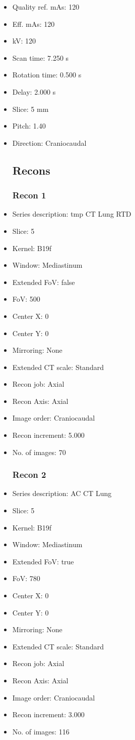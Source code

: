 \documentclass[12pt]{article}
\begin{document}
\begin{itemize}
\subsection{Scan}
\item Quality ref. mAs: 120\item Eff. mAs: 120\item kV: 120\item Scan time: 7.250 s\item Rotation time: 0.500 s\item Delay: 2.000 s\item Slice: 5 mm\item Pitch: 1.40\item Direction: Craniocaudal\subsection{Recons}

\subsubsection{Recon 1}
\item Series description: tmp CT Lung RTD
\item Slice: 5
\item Kernel: B19f
\item Window: Mediastinum
\item Extended FoV: false
\item FoV: 500
\item Center X: 0
\item Center Y: 0
\item Mirroring: None
\item Extended CT scale: Standard
\item Recon job: Axial
\item Recon Axis: Axial
\item Image order: Craniocaudal
\item Recon increment: 5.000
\item No. of images: 70
\subsubsection{Recon 2}
\item Series description: AC CT Lung
\item Slice: 5
\item Kernel: B19f
\item Window: Mediastinum
\item Extended FoV: true
\item FoV: 780
\item Center X: 0
\item Center Y: 0
\item Mirroring: None
\item Extended CT scale: Standard
\item Recon job: Axial
\item Recon Axis: Axial
\item Image order: Craniocaudal
\item Recon increment: 3.000
\item No. of images: 116

\end{itemize}
\end{document}

